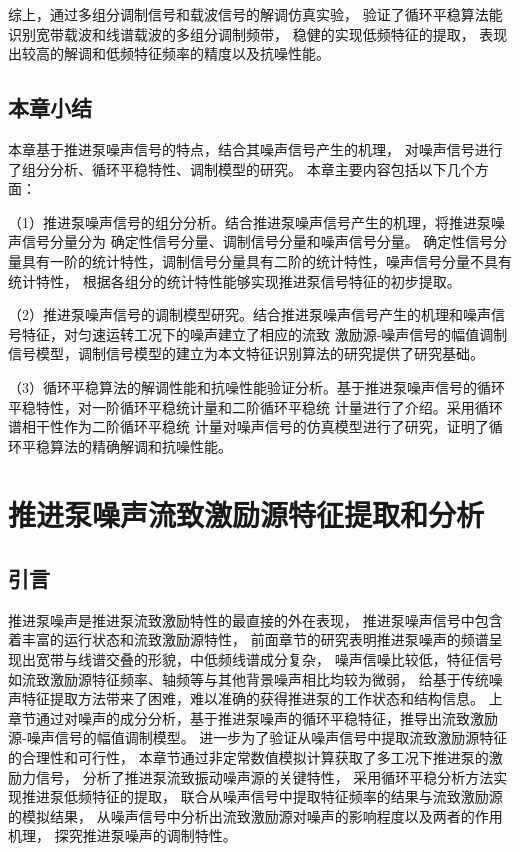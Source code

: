 综上，通过多组分调制信号和载波信号的解调仿真实验，
验证了循环平稳算法能识别宽带载波和线谱载波的多组分调制频带，
稳健的实现低频特征的提取，
表现出较高的解调和低频特征频率的精度以及抗噪性能。
\section{本章小结}
本章基于推进泵噪声信号的特点，结合其噪声信号产生的机理，
对噪声信号进行了组分分析、循环平稳特性、调制模型的研究。
本章主要内容包括以下几个方面：

（1）推进泵噪声信号的组分分析。结合推进泵噪声信号产生的机理，将推进泵噪声信号分量分为
确定性信号分量、调制信号分量和噪声信号分量。
确定性信号分量具有一阶的统计特性，调制信号分量具有二阶的统计特性，噪声信号分量不具有统计特性，
根据各组分的统计特性能够实现推进泵信号特征的初步提取。 

（2）推进泵噪声信号的调制模型研究。结合推进泵噪声信号产生的机理和噪声信号特征，对匀速运转工况下的噪声建立了相应的流致
激励源-­噪声信号的幅值调制信号模型，调制信号模型的建立为本文特征识别算法的研究提供了研究基础。 

（3）循环平稳算法的解调性能和抗噪性能验证分析。基于推进泵噪声信号的循环平稳特性，对一阶循环平稳统计量和二阶循环平稳统
计量进行了介绍。采用循环谱相干性作为二阶循环平稳统
计量对噪声信号的仿真模型进行了研究，证明了循环平稳算法的精确解调和抗噪性能。

\chapter{推进泵噪声流致激励源特征提取和分析}
\section{引言}
推进泵噪声是推进泵流致激励特性的最直接的外在表现，
推进泵噪声信号中包含着丰富的运行状态和流致激励源特性，
前面章节的研究表明推进泵噪声的频谱呈现出宽带与线谱交叠的形貌，中低频线谱成分复杂，
噪声信噪比较低，特征信号如流致激励源特征频率、轴频等与其他背景噪声相比均较为微弱，
给基于传统噪声特征提取方法带来了困难，难以准确的获得推进泵的工作状态和结构信息。
上章节通过对噪声的成分分析，基于推进泵噪声的循环平稳特征，推导出流致激励源-噪声信号的幅值调制模型。
进一步为了验证从噪声信号中提取流致激励源特征的合理性和可行性，
本章节通过非定常数值模拟计算获取了多工况下推进泵的激励力信号，
分析了推进泵流致振动噪声源的关键特性，
采用循环平稳分析方法实现推进泵低频特征的提取，
联合从噪声信号中提取特征频率的结果与流致激励源的模拟结果，
从噪声信号中分析出流致激励源对噪声的影响程度以及两者的作用机理，
探究推进泵噪声的调制特性。
